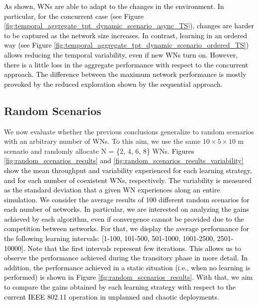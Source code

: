 \documentclass{article}
\begin{document}
	\textcolor{black}{As shown, WNs are able to adapt to the changes in the environment. In particular, for the concurrent case (see Figure \ref{fig:temporal_aggregate_tpt_dynamic_scenario_async_TS}), changes are harder to be captured as the network size increases. In contrast, learning in an ordered way (see Figure \ref{fig:temporal_aggregate_tpt_dynamic_scenario_ordered_TS}) allows reducing the temporal variability, even if new WNs turn on. However, there is a little loss in the aggregate performance with respect to the concurrent approach. The difference between the maximum network performance is mostly provoked by the reduced exploration shown by the sequential approach.}
	\subsection{Random Scenarios}
	\label{section:random}
	
	We now evaluate whether the previous conclusions generalize to random scenarios with an arbitrary number of WNs. To this aim, we use the same $10\times5\times 10$ m scenario and randomly allocate N = \{2, 4, 6, 8\} WNs. \textcolor{black}{Figures \ref{fig:random_scenarios_results} and \ref{fig:random_scenarios_results_variability} show the mean throughput and variability experienced for each learning strategy, and for each number of coexistent WNs, respectively. The variability is measured as the standard deviation that a given WN experiences along an entire simulation. We consider the average results of 100 different random scenarios for each number of networks. In particular, we are interested on analyzing the gains achieved by each algorithm, even if convergence cannot be provided due to the competition between networks. For that, we display the average performance for the following learning intervals: [1-100, 101-500, 501-1000, 1001-2500, 2501-10000]. Note that the first intervals represent few iterations. This allows us to observe the performance achieved during the transitory phase in more detail. In addition, the performance achieved in a static situation (i.e., when no learning is performed) is shown in Figure \ref{fig:random_scenarios_results}. With that, we aim to compare the gains obtained by each learning strategy with respect to the current IEEE 802.11 operation in unplanned and chaotic deployments.}
	
\end{document}
